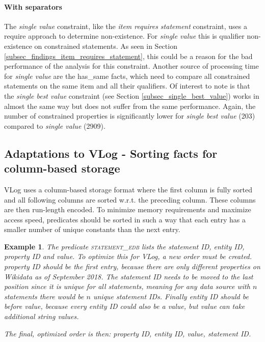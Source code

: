 \documentclass[hyperref,bachelorofscience,fleqn]{cgvpub}
\newtheorem{example}{Example}
\begin{document}
\paragraph{With separators}
The \emph{single value} constraint, like the \emph{item requires statement} constraint, uses a require approach to determine non-existence. For \emph{single value} this is qualifier non-existence on constrained statements. As seen in Section \ref{subsec_findings_item_requires_statement}, this could be a reason for the bad performance of the analysis for this constraint. Another source of processing time for \emph{single value} are the has\_same facts, which need to compare all constrained statements on the same item and all their qualifiers. Of interest to note is that the \emph{single best value} constraint (see Section \ref{subsec_single_best_value}) works in almost the same way but does not suffer from the same performance. Again, the number of constrained properties is significantly lower for \emph{single best value} (203) compared to \emph{single value} (2909).

\subsection{Adaptations to VLog - Sorting facts for column-based storage}
VLog uses a column-based storage format where the first column is fully sorted and all following columns are sorted w.r.t. the preceding column. These columns are then run-length encoded. To minimize memory requirements and maximize access speed, predicates should be sorted in such a way that each entry has a smaller number of unique constants than the next entry.

\begin{example}
The predicate \textsc{statement\_edb} lists the \emph{statement ID}, \emph{entity ID}, \emph{property ID} and \emph{value}. To optimize this for VLog, a new order must be created. \emph{property ID} should be the first entry, because there are only  different properties on Wikidata as of September 2018. The \emph{statement ID} needs to be moved to the last position since it is unique for all statements, meaning for any data source with \(n\) statements there would be \(n\) unique \emph{statement IDs}. Finally \emph{entity ID} should be before \emph{value}, because every \emph{entity ID} could also be a \emph{value}, but value can take additional string values.

The final, optimized order is then: \emph{property ID}, \emph{entity ID}, \emph{value}, \emph{statement ID}.
\end{example}
\end{document}
